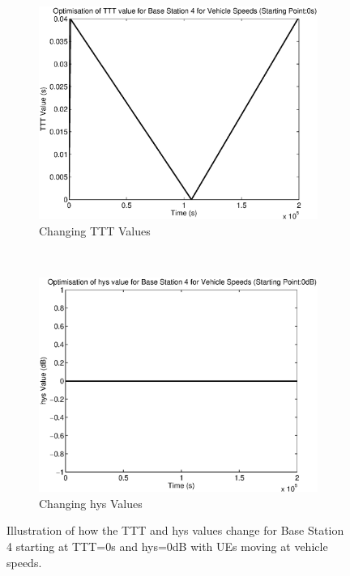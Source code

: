 \begin{figure}[H]
        \centering
        \begin{subfigure}[b]{0.49\textwidth}
                \includegraphics[width=\textwidth]{figures/graphs/vehlow/TTT4.eps}
                \caption{Changing TTT Values}
        \end{subfigure}%
        ~ %
        \begin{subfigure}[b]{0.49\textwidth}
                \includegraphics[width=\textwidth]{figures/graphs/vehlow/hys4.eps}
                \caption{Changing hys Values}
        \end{subfigure}
        \caption{Illustration of how the TTT and hys values change for Base Station 4 starting at TTT=0s and hys=0dB with UEs moving at vehicle speeds.}
\end{figure}
